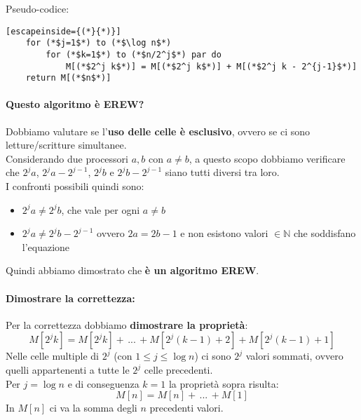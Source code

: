 Pseudo-codice:
\begin{lstlisting}[escapeinside={(*}{*)}]
	for (*$j=1$*) to (*$\log n$*)
		for (*$k=1$*) to (*$n/2^j$*) par do
			M[(*$2^j k$*)] = M[(*$2^j k$*)] + M[(*$2^j k - 2^{j-1}$*)]
	return M[(*$n$*)]
\end{lstlisting}


\paragraph{Questo algoritmo è EREW?} Dobbiamo valutare se l'\textbf{uso delle celle è esclusivo}, ovvero se ci sono letture/scritture simultanee.\\

Considerando due processori $a,b$ con $a \neq b$, a questo scopo dobbiamo verificare che $2^j a$, $2^j a - 2^{j-1}$, $2^j b$ e $2^j b - 2^{j-1}$ siano tutti diversi tra loro.\\

I confronti possibili quindi sono:
\begin{itemize}
	\item $2^j a \neq 2^j b$, che vale per ogni $a \neq b$
	\item $2^j a \neq 2^jb - 2^{j-1}$ ovvero $2 a = 2b - 1$ e non esistono valori $\in \mathbb{N}$ che soddisfano l'equazione
\end{itemize}

Quindi abbiamo dimostrato che \textbf{è un algoritmo EREW}.

\newpage

\paragraph{Dimostrare la correttezza:} Per la correttezza dobbiamo \textbf{dimostrare la proprietà}:
$$ M[2^j k] = M[2^j k] + \, ... \, + M[2^j (k-1) + 2] + M[2^j (k-1) + 1] $$
Nelle celle multiple di $2^j$ (con $1 \leq j \leq \log n$) ci sono $2^j$ valori sommati, ovvero quelli appartenenti a tutte le $2^j$ celle precedenti.\\

Per $j = \log n$ e di conseguenza $k=1$ la proprietà sopra risulta:
$$ M[n] = M[n] + \, ... \, + M[1] $$
In $M[n]$ ci va la somma degli $n$ precedenti valori.\\

